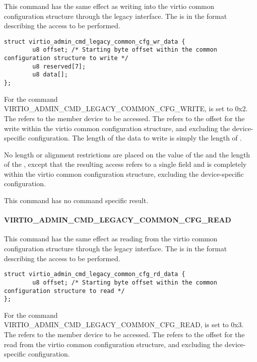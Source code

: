 This command has the same effect as writing into the virtio common configuration
structure through the legacy interface. The  is in
the format  describing
the access to be performed.

\begin{lstlisting}
struct virtio_admin_cmd_legacy_common_cfg_wr_data {
        u8 offset; /* Starting byte offset within the common configuration structure to write */
        u8 reserved[7];
        u8 data[];
};
\end{lstlisting}

For the command VIRTIO_ADMIN_CMD_LEGACY_COMMON_CFG_WRITE, 
is set to 0x2.
The  refers to the member device to be accessed.
The  refers to the offset for the write within the virtio common
configuration structure, and excluding the device-specific configuration.
The length of the data to write is simply the length of .

No length or alignment restrictions are placed on the value of the
 and the length of the , except that the resulting
access refers to a single field and is completely within the virtio common
configuration structure, excluding the device-specific configuration.

This command has no command specific result.

\paragraph{VIRTIO_ADMIN_CMD_LEGACY_COMMON_CFG_READ}
\label{par:Basic Facilities of a Virtio Device / Device groups / Group administration commands / Legacy Interface / VIRTIO-ADMIN-CMD-LEGACY-COMMON-CFG-READ}

This command has the same effect as reading from the virtio common configuration
structure through the legacy interface. The  is in
the format  describing
the access to be performed.

\begin{lstlisting}
struct virtio_admin_cmd_legacy_common_cfg_rd_data {
        u8 offset; /* Starting byte offset within the common configuration structure to read */
};
\end{lstlisting}

For the command VIRTIO_ADMIN_CMD_LEGACY_COMMON_CFG_READ, 
is set to 0x3.
The  refers to the member device to be accessed.
The  refers to the offset for the read from the virtio common
configuration structure, and excluding the device-specific configuration.

